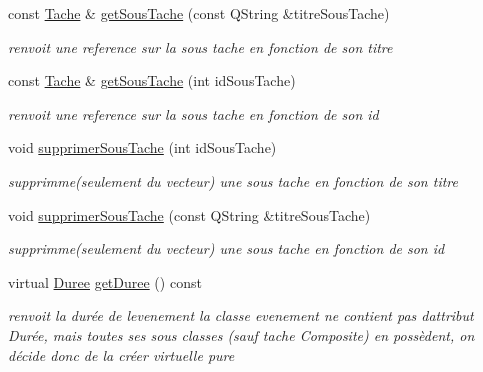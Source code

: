 \begin{DoxyCompactItemize}
\item 
const \hyperlink{class_tache}{Tache} \& \hyperlink{class_tache_composite_a8845d2b31a52770fbfc5fd309edb51eb}{get\+Sous\+Tache} (const Q\+String \&titre\+Sous\+Tache)
\begin{DoxyCompactList}\small\item\em renvoit une reference sur la sous tache en fonction de son titre \end{DoxyCompactList}\item 
const \hyperlink{class_tache}{Tache} \& \hyperlink{class_tache_composite_ac5a3b0618dd26d26509d1bc9db8a41b7}{get\+Sous\+Tache} (int id\+Sous\+Tache)
\begin{DoxyCompactList}\small\item\em renvoit une reference sur la sous tache en fonction de son id \end{DoxyCompactList}\item 
void \hyperlink{class_tache_composite_ac1f585bd7492034a7968f24ae28b47df}{supprimer\+Sous\+Tache} (int id\+Sous\+Tache)
\begin{DoxyCompactList}\small\item\em supprimme(seulement du vecteur) une sous tache en fonction de son titre \end{DoxyCompactList}\item 
void \hyperlink{class_tache_composite_a492a7906ff0437f406213206c1425c7e}{supprimer\+Sous\+Tache} (const Q\+String \&titre\+Sous\+Tache)
\begin{DoxyCompactList}\small\item\em supprimme(seulement du vecteur) une sous tache en fonction de son id \end{DoxyCompactList}\item 
\hypertarget{class_tache_composite_a2731407832e1ce44ec39ee4296f10aef}{}virtual \hyperlink{class_duree}{Duree} \hyperlink{class_tache_composite_a2731407832e1ce44ec39ee4296f10aef}{get\+Duree} () const \label{class_tache_composite_a2731407832e1ce44ec39ee4296f10aef}

\begin{DoxyCompactList}\small\item\em renvoit la durée de l\textquotesingle{}evenement la classe evenement ne contient pas d\textquotesingle{}attribut Durée, mais toutes ses sous classes (sauf tache Composite) en possèdent, on décide donc de la créer virtuelle pure \end{DoxyCompactList}\end{DoxyCompactItemize}
